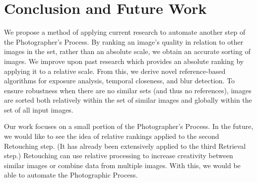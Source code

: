 \documentclass[10pt,twocolumn,letterpaper]{article}
\begin{document}
\section{Conclusion and Future Work}
We propose a method of applying current research to automate another step of the Photographer's Process. By ranking an image's quality in relation to other images in the set, rather than an absolute scale, we obtain an accurate sorting of images. We improve upon past research which provides an absolute ranking by applying it to a relative scale. From this, we derive novel reference-based algorithms for exposure analysis, temporal closeness, and blur detection. To ensure robustness when there are no similar sets (and thus no references), images are sorted both relatively within the set of similar images and globally within the set of all input images.

Our work focuses on a small portion of the Photographer's Process. In the future, we would like to see the idea of relative rankings applied to the second Retouching step. (It has already been extensively applied to the third Retrieval step.) Retouching can use relative processing to increase creativity between similar images or combine data from multiple images. With this, we would be able to automate the Photographic Process.


\end{document}
